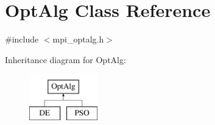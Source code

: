 \hypertarget{class_opt_alg}{}\section{Opt\+Alg Class Reference}
\label{class_opt_alg}


{\ttfamily \#include $<$mpi\+\_\+optalg.\+h$>$}

Inheritance diagram for Opt\+Alg\+:\begin{figure}[H]
\begin{center}
\leavevmode
\includegraphics[height=2.000000cm]{class_opt_alg}
\end{center}
\end{figure}
